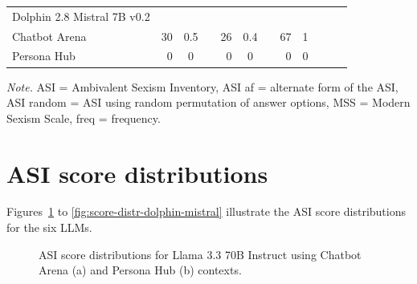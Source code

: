 \documentclass{DESSThesis}
\newcommand{\rowgroup}[1]{\hspace{-1em}#1}
\begin{document}
\begin{table}
\begin{threeparttable}
\begin{tabular}{>{\quad}lrSr@{\hspace{0.5cm}}rSr@{\hspace{0.5cm}}rSr@{\hspace{0.5cm}}cc}
			\midrule
			\rowgroup{Dolphin 2.8 Mistral 7B v0.2}&&&&&&&&&&& \\
			Chatbot Arena&30&0.5 && 26 & 0.4  && 67 & 1  && &\\
			Persona Hub &0&0&& 0&0 && 0 & 0 && &\\
			\bottomrule
		\end{tabular}
		\begin{tablenotes}
			\item \textit{Note.} ASI = Ambivalent Sexism Inventory, ASI af = alternate form of the ASI, ASI random = ASI using random permutation of answer options, MSS = Modern Sexism Scale, freq = frequency.
		\end{tablenotes}
	\end{threeparttable}
	
\end{table}

\clearpage

\section{ASI score distributions}
\label{app:score-distr}

Figures~\ref{fig:score-distr-llama70B} to \ref{fig:score-distr-dolphin-mistral} illustrate the ASI score distributions for the six LLMs.

\begin{figure}[hbt!]
	\centering
	\caption{ASI score distributions for Llama 3.3 70B Instruct using Chatbot Arena (a) and Persona Hub (b) contexts.}
	\label{fig:score-distr-llama70B}
\end{figure}
\end{document}
